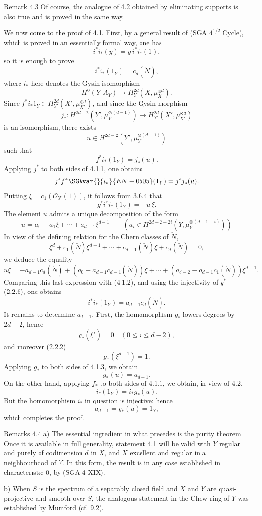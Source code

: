 \begin{statement}{Remark 4.3}
Of course, the analogue of 4.2 obtained by eliminating supports is also true and is proved in the same way.
\end{statement}

We now come to the proof of 4.1. First, by a general result of (SGA $4^{1/2}$ Cycle), which is proved in an essentially formal way, one has
\[
i^*i_*(y)=y\,i^*i_*(1),
\]
so it is enough to prove
\[
i^*i_*(1_Y)=c_d(\check N),
\]
where $i_*$ here denotes the Gysin isomorphism
\[
H^0(Y,A_Y)\to H_Y^{2d}(X,\mu_X^{\otimes d}).
\]
Since $f^*i_*1_Y\in H_{Y'}^{2d}(X',\mu_{X'}^{\otimes d})$, and since the Gysin morphism
\[
j_*:H^{2d-2}(Y',\mu_{Y'}^{\otimes(d-1)})
\to H_{Y'}^{2d}(X',\mu_{X'}^{\otimes d})
\]
is an isomorphism, there exists
\[
u\in H^{2d-2}(Y',\mu_{Y'}^{\otimes(d-1)})
\]
such that
\[
f^*i_*(1_Y)=j_*(u).
\tag{4.1.1}
\]
Applying $j^*$ to both sides of 4.1.1, one obtains
\[
j^*f^*\SGAvar{}{i_*}{EN-0505}(1_Y)=j^*j_*(u).
\]
Putting $\xi=c_1(\mathcal O_{Y'}(1))$, it follows from 3.6.4 that
\[
g^*i^*i_*(1_Y)=-u\,\xi.
\tag{4.1.2}
\]
The element $u$ admits a unique decomposition of the form
\[
u=a_0+a_1\xi+\cdots+a_{d-1}\xi^{d-1}
\qquad
(a_i\in H^{2d-2-2i}(Y,\mu_Y^{\otimes(d-1-i)}))
\tag{4.1.3}
\]
In view of the defining relation for the Chern classes of $\check N$,
\[
\xi^d+c_1(\check N)\xi^{d-1}+\cdots+c_{d-1}(\check N)\xi+c_d(\check N)=0,
\tag{4.1.4}
\]
we deduce the equality
\[
u\xi=-a_{d-1}c_d(\check N)+(a_0-a_{d-1}c_{d-1}(\check N))\xi
+\cdots+(a_{d-2}-a_{d-1}c_1(\check N))\xi^{d-1}.
\]
Comparing this last expression with (4.1.2), and using the injectivity of $g^*$ (2.2.6), one obtains
\[
i^*i_*(1_Y)=a_{d-1}c_d(\check N).
\tag{4.1.5}
\]
It remains to determine $a_{d-1}$. First, the homomorphism $g_*$ lowers degrees by $2d-2$, hence
\[
g_*(\xi^i)=0\quad(0\le i\le d-2),
\]
and moreover (2.2.2)
\[
g_*(\xi^{d-1})=1.
\]
Applying $g_*$ to both sides of 4.1.3, we obtain
\[
g_*(u)=a_{d-1}.
\tag{4.1.6}
\]
On the other hand, applying $f_*$ to both sides of 4.1.1, we obtain, in view of 4.2,
\[
i_*(1_Y)=i_*g_*(u).
\tag{4.1.7}
\]
But the homomorphism $i_*$ in question is injective; hence
\[
a_{d-1}=g_*(u)=1_Y,
\]
which completes the proof.

\begin{statement}{Remarks 4.4}
a) The essential ingredient in what precedes is the purity theorem. Once it is available in full generality, statement 4.1 will be valid with $Y$ regular and purely of codimension $d$ in $X$, and $X$ excellent and regular in a neighbourhood of $Y$. In this form, the result is in any case established in characteristic $0$, by (SGA 4 XIX).

b) When $S$ is the spectrum of a separably closed field and $X$ and $Y$ are quasi-projective and smooth over $S$, the analogous statement in the Chow ring of $Y$ was established by Mumford (cf. 9.2).
\end{statement}

